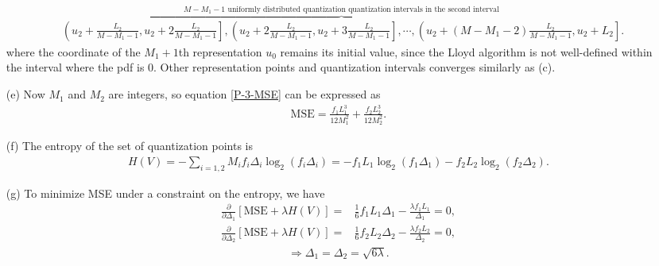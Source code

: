 \documentclass{assignment}
\begin{document}
\begin{sol}
\begin{itemize}
{\begin{align*}
            &\overbrace{\left(u_2+\frac{L_2}{M-M_1-1},u_2+2\frac{L_2}{M-M_1-1}\right],\left(u_2+2\frac{L_2}{M-M_1-1},u_2+3\frac{L_2}{M-M_1-1}\right],\cdots,\left(u_2+(M-M_1-2)\frac{L_2}{M-M_1-1},u_2+L_2\right]}^{M-M_1-1\text{ uniformly distributed quantization quantization intervals in the second interval}}.
        \end{align*}
        }%
        where the coordinate of the $M_1+1$th representation $u_0$ remains its initial value, since the Lloyd algorithm is not well-defined within the interval where the pdf is $0$. Other representation points and quantization intervals converges similarly as (c).
        \item[(e)] Now $M_1$ and $M_2$ are integers, so equation \eqref{P-3-MSE} can be expressed as
        \begin{align}
            \text{MSE}=\frac{f_1L_1^3}{12M_1^2}+\frac{f_2L_2^3}{12M_2^2}.
        \end{align}
        \item[(f)] The entropy of the set of quantization points is
        \begin{align}
            H(V)=-\sum_{i=1,2}M_if_i\Delta_i\log_2(f_i\Delta_i)=-f_1L_1\log_2(f_1\Delta_1)-f_2L_2\log_2(f_2\Delta_2).
        \end{align}
        \item[(g)] To minimize MSE under a constraint on the entropy, we have
        \begin{align}
            \frac{\partial}{\partial\Delta_1}[\text{MSE}+\lambda H(V)]=&\frac{1}{6}f_1L_1\Delta_1-\frac{\lambda f_1L_1}{\Delta_1}=0,\\
            \frac{\partial}{\partial\Delta_2}[\text{MSE}+\lambda H(V)]=&\frac{1}{6}f_2L_2\Delta_2-\frac{\lambda f_2L_2}{\Delta_2}=0,
        \end{align}
        \begin{align}
            \Longrightarrow\Delta_1=\Delta_2=\sqrt{6\lambda}.
        \end{align}
    \end{itemize}
\end{sol}
\end{document}
